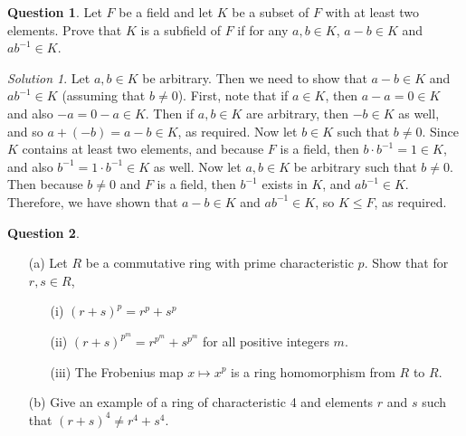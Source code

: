 \documentclass[11pt]{amsart}
\theoremstyle{definition}\newtheorem{question}{Question}
\theoremstyle{definition}\newtheorem{claim}{Claim}
\theoremstyle{remark}\newtheorem*{solution}{Solution}
\begin{document}
\newpage

\begin{question}
    Let $F$ be a field and let $K$ be a subset of $F$ with at least two elements. Prove that $K$ is a subfield of $F$ if for any $a, b \in K$, $a - b \in K$ and $ab^{-1} \in K$.
\end{question}

\begin{solution}
    Let $a, b \in K$ be arbitrary. Then we need to show that $a - b \in K$ and $ab^{-1} \in K$ (assuming that $b \neq 0$). First, note that if $a \in K$, then $a - a = 0 \in K$ and also $-a = 0 - a \in K$. Then if $a, b \in K$ are arbitrary, then $-b \in K$ as well, and so $a + (-b) = a - b \in K$, as required. Now let $b \in K$ such that $b \neq 0$. Since $K$ contains at least two elements, and because $F$ is a field, then $b \cdot b^{-1} = 1 \in K$, and also $b^{-1} = 1 \cdot b^{-1} \in K$ as well. Now let $a, b \in K$ be arbitrary such that $b \neq 0$. Then because $b \neq 0$ and $F$ is a field, then $b^{-1}$ exists in $K$, and $ab^{-1} \in K$. Therefore, we have shown that $a - b \in K$ and $ab^{-1} \in K$, so $K \leq F$, as required.
\end{solution}

\newpage

\begin{question}
    \begin{itemize}
        \item[(a)] Let $R$ be a commutative ring with prime characteristic $p$. Show that for $r, s \in R$,
        \begin{itemize}
            \item[(i)] $(r + s)^p = r^p + s^p$
            \item[(ii)] $(r + s)^{p^m} = r^{p^m} + s^{p^m}$ for all positive integers $m$.
            \item[(iii)] The Frobenius map $x \mapsto x^p$ is a ring homomorphism from $R$ to $R$.
        \end{itemize}
        \item[(b)] Give an example of a ring of characteristic 4 and elements $r$ and $s$ such that $(r + s)^4 \neq r^4 + s^4$.
    \end{itemize}
\end{question}
\end{document}
